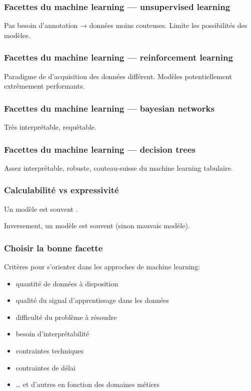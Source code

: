 \begin{frame}
  \frametitle{Facettes du machine learning — unsupervised learning}
  Pas besoin d'annotation → données moins couteuses. Limite les
  possibilités des modèles.
\end{frame}

\begin{frame}
  \frametitle{Facettes du machine learning — reinforcement learning}
   Paradigme de d'acquisition des données
  différent. Modèles potentiellement extrêmement performants.
\end{frame}

\begin{frame}
  \frametitle{Facettes du machine learning — bayesian networks}
  Très interprétable, requêtable.
\end{frame}

\begin{frame}
  \frametitle{Facettes du machine learning — decision trees}
   Assez interprétable, robuste, couteau-suisse
  du machine learning tabulaire.
\end{frame}

\begin{frame}
  \frametitle{Calculabilité vs expressivité}

  Un modèle  est souvent .

  Inversement, un modèle  est souvent
   (sinon mauvais modèle).
\end{frame}

\begin{frame}
  \frametitle{Choisir la bonne facette}
  Critères pour s'orienter dans les approches de machine learning:
  \begin{itemize}[<+->]
  \item quantité de données à disposition
  \item qualité du signal d'apprentissage dans les données
  \item difficulté du problème à résoudre
  \item besoin d'interprétabilité
  \item contraintes techniques
  \item contraintes de délai
  \item … et d'autres en fonction des domaines métiers
  \end{itemize}
\end{frame}

